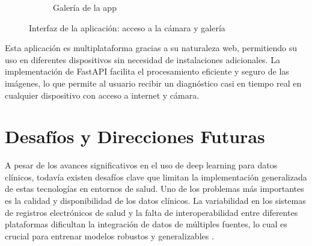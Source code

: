 \documentclass{article}
\begin{document}
\begin{figure}[H]
\begin{subfigure}[t]{0.45\textwidth}
		\caption{Galería de la app}
	\end{subfigure}
	\caption{Interfaz de la aplicación: acceso a la cámara y galería}
	\label{fig:app_interface}
\end{figure}
Esta aplicación es multiplataforma gracias a su naturaleza web, permitiendo su uso en diferentes dispositivos sin necesidad de instalaciones adicionales. La implementación de FastAPI facilita el procesamiento eficiente y seguro de las imágenes, lo que permite al usuario recibir un diagnóstico casi en tiempo real en cualquier dispositivo con acceso a internet y cámara.
\section{Desafíos y Direcciones Futuras}

A pesar de los avances significativos en el uso de deep learning para datos clínicos, todavía existen desafíos clave que limitan la implementación generalizada de estas tecnologías en entornos de salud. Uno de los problemas más importantes es la calidad y disponibilidad de los datos clínicos. La variabilidad en los sistemas de registros electrónicos de salud y la falta de interoperabilidad entre diferentes plataformas dificultan la integración de datos de múltiples fuentes, lo cual es crucial para entrenar modelos robustos y generalizables \cite{johnson2016mimic}.
\end{document}
